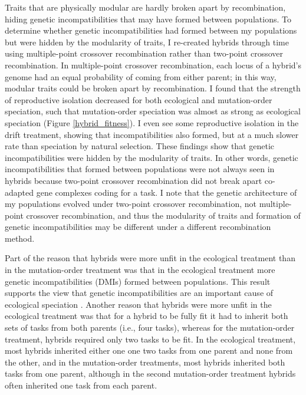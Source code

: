 \begin{doublespace}
Traits that are physically modular
are hardly broken apart by recombination,
hiding genetic incompatibilities
that may have formed between populations.
%
To determine whether genetic incompatibilities
had formed between my populations
but were hidden by the modularity of traits,
I re-created hybrids through time using multiple-point crossover recombination
rather than two-point crossover recombination.
%
In multiple-point crossover recombination,
each locus of a hybrid's genome had an equal probability
of coming from either parent;
in this way, modular traits could be broken apart by recombination.
%
I found that the strength of reproductive isolation
decreased for both ecological and mutation-order speciation,
such that mutation-order speciation
was almost as strong as ecological speciation (Figure \ref{hybrid_fitness}).
%
I even see some reproductive isolation in the drift treatment,
showing that incompatibilities also formed,
but at a much slower rate than speciation by natural selection.
%
These findings show that genetic incompatibilities
were hidden by the modularity of traits.
%
In other words, genetic incompatibilities that formed between populations
were not always seen in hybrids because two-point crossover recombination
did not break apart co-adapted gene complexes coding for a task.
%
I note that the genetic architecture of my populations
evolved under two-point crossover recombination,
not multiple-point crossover recombination,
and thus the modularity of traits
and formation of genetic incompatibilities
may be different under a different recombination method.



Part of the reason that hybrids were more unfit in the ecological treatment
than in the mutation-order treatment was that in the ecological treatment
more genetic incompatibilities (DMIs) formed between populations.
%
This result supports the view that genetic incompatibilities
are an important cause of ecological speciation \citep{run05}.
%
Another reason that hybrids were more unfit in the ecological treatment was
that for a hybrid to be fully fit it had to inherit both sets of tasks from
both parents (i.e., four tasks), whereas for the mutation-order treatment,
hybrids required only two tasks to be fit.
%
In the ecological treatment, most hybrids inherited either one one two tasks
from one parent and none from the other, and in the mutation-order treatments,
most hybrids inherited both tasks from one parent, although in the second
mutation-order treatment hybrids often inherited one task from each parent.




\end{doublespace}
